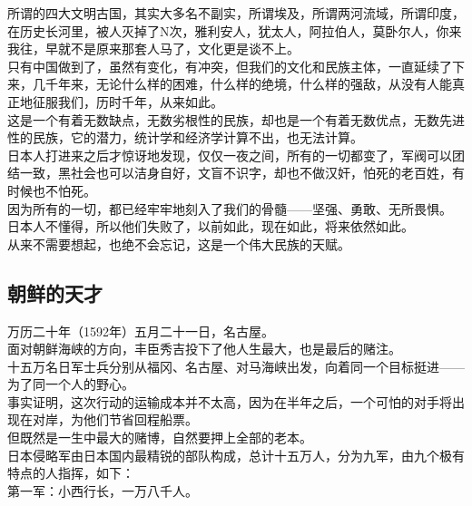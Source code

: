 \begin{multicols}{\theparacolNo}
所谓的四大文明古国，其实大多名不副实，所谓埃及，所谓两河流域，所谓印度，在历史长河里，被人灭掉了N次，雅利安人，犹太人，阿拉伯人，莫卧尔人，你来我往，早就不是原来那套人马了，文化更是谈不上。\\

只有中国做到了，虽然有变化，有冲突，但我们的文化和民族主体，一直延续了下来，几千年来，无论什么样的困难，什么样的绝境，什么样的强敌，从没有人能真正地征服我们，历时千年，从来如此。\\

这是一个有着无数缺点，无数劣根性的民族，却也是一个有着无数优点，无数先进性的民族，它的潜力，统计学和经济学计算不出，也无法计算。\\

日本人打进来之后才惊讶地发现，仅仅一夜之间，所有的一切都变了，军阀可以团结一致，黑社会也可以洁身自好，文盲不识字，却也不做汉奸，怕死的老百姓，有时候也不怕死。\\

因为所有的一切，都已经牢牢地刻入了我们的骨髓——坚强、勇敢、无所畏惧。\\

日本人不懂得，所以他们失败了，以前如此，现在如此，将来依然如此。\\

从来不需要想起，也绝不会忘记，这是一个伟大民族的天赋。\\

\subsection{朝鲜的天才}
万历二十年（1592年）五月二十一日，名古屋。\\

面对朝鲜海峡的方向，丰臣秀吉投下了他人生最大，也是最后的赌注。\\

十五万名日军士兵分别从福冈、名古屋、对马海峡出发，向着同一个目标挺进——为了同一个人的野心。\\

事实证明，这次行动的运输成本并不太高，因为在半年之后，一个可怕的对手将出现在对岸，为他们节省回程船票。\\

但既然是一生中最大的赌博，自然要押上全部的老本。\\

日本侵略军由日本国内最精锐的部队构成，总计十五万人，分为九军，由九个极有特点的人指挥，如下：\\

第一军：小西行长，一万八千人。\\


\end{multicols}
